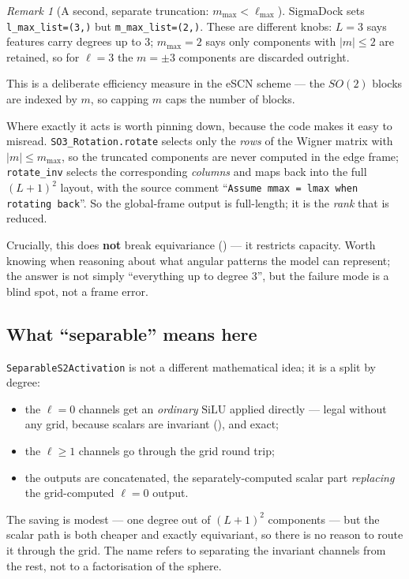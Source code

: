 \documentclass[11pt,a4paper]{report}
\theoremstyle{definition}
\theoremstyle{remark}
\newtheorem{remark}[remark]{Remark}
\newcommand{\pyfunc}[1]{\texttt{#1}}
\begin{document}
\begin{remark}[A second, separate truncation: $m_{\max}<\ell_{\max}$]
\label{rem:mmax-truncation}
SigmaDock sets \texttt{l\_max\_list=(3,)} but \texttt{m\_max\_list=(2,)}.
These are different knobs: $L=3$ says features carry degrees up to $3$;
$m_{\max}=2$ says only components with $|m|\le2$ are retained, so for
$\ell=3$ the $m=\pm3$ components are discarded outright.

This is a deliberate efficiency measure in the eSCN scheme --- the $SO(2)$
blocks are indexed by $m$, so capping $m$ caps the number of blocks.

Where exactly it acts is worth pinning down, because the code makes it easy
to misread. \pyfunc{SO3\_Rotation.rotate} selects only the \emph{rows} of the
Wigner matrix with $|m|\le m_{\max}$, so the truncated components are never
computed in the edge frame; \pyfunc{rotate\_inv} selects the corresponding
\emph{columns} and maps back into the full $(L+1)^2$ layout, with the source
comment ``\texttt{Assume mmax = lmax when rotating back}''. So the global-frame
output is full-length; it is the \emph{rank} that is reduced.

Crucially, this does \textbf{not} break equivariance
() --- it restricts capacity. Worth knowing when
reasoning about what angular patterns the model can represent; the answer is
not simply ``everything up to degree $3$'', but the failure mode is a blind
spot, not a frame error.
\end{remark}

\subsection{What ``separable'' means here}
\label{sec:separable-meaning}

\pyfunc{SeparableS2Activation} is not a different mathematical idea; it is a
split by degree:
\begin{itemize}[nosep]
\item the $\ell=0$ channels get an \emph{ordinary} $\mathrm{SiLU}$ applied
directly --- legal without any grid, because scalars are invariant
(), and exact;
\item the $\ell\ge1$ channels go through the grid round trip;
\item the outputs are concatenated, the separately-computed scalar part
\emph{replacing} the grid-computed $\ell=0$ output.
\end{itemize}
The saving is modest --- one degree out of $(L+1)^2$ components --- but the
scalar path is both cheaper and exactly equivariant, so there is no reason to
route it through the grid. The name refers to separating the invariant
channels from the rest, not to a factorisation of the sphere.
\end{document}
